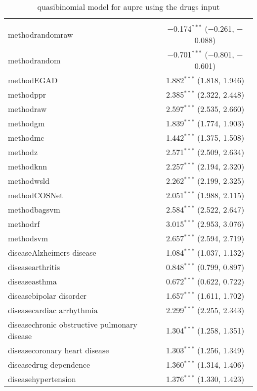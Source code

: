 
\begin{table}[!htbp] \centering 
  \caption{quasibinomial model for auprc using the drugs input} 
  \label{} 
\begin{tabular}{@{\extracolsep{5pt}}lc} 
\\[-1.8ex]\hline 
\hline \\[-1.8ex] 
 methodrandomraw & $-$0.174$^{***}$ ($-$0.261, $-$0.088) \\ 
  methodrandom & $-$0.701$^{***}$ ($-$0.801, $-$0.601) \\ 
  methodEGAD & 1.882$^{***}$ (1.818, 1.946) \\ 
  methodppr & 2.385$^{***}$ (2.322, 2.448) \\ 
  methodraw & 2.597$^{***}$ (2.535, 2.660) \\ 
  methodgm & 1.839$^{***}$ (1.774, 1.903) \\ 
  methodmc & 1.442$^{***}$ (1.375, 1.508) \\ 
  methodz & 2.571$^{***}$ (2.509, 2.634) \\ 
  methodknn & 2.257$^{***}$ (2.194, 2.320) \\ 
  methodwsld & 2.262$^{***}$ (2.199, 2.325) \\ 
  methodCOSNet & 2.051$^{***}$ (1.988, 2.115) \\ 
  methodbagsvm & 2.584$^{***}$ (2.522, 2.647) \\ 
  methodrf & 3.015$^{***}$ (2.953, 3.076) \\ 
  methodsvm & 2.657$^{***}$ (2.594, 2.719) \\ 
  diseaseAlzheimers disease & 1.084$^{***}$ (1.037, 1.132) \\ 
  diseasearthritis & 0.848$^{***}$ (0.799, 0.897) \\ 
  diseaseasthma & 0.672$^{***}$ (0.622, 0.722) \\ 
  diseasebipolar disorder & 1.657$^{***}$ (1.611, 1.702) \\ 
  diseasecardiac arrhythmia & 2.299$^{***}$ (2.255, 2.343) \\ 
  diseasechronic obstructive pulmonary disease & 1.304$^{***}$ (1.258, 1.351) \\ 
  diseasecoronary heart disease & 1.303$^{***}$ (1.256, 1.349) \\ 
  diseasedrug dependence & 1.360$^{***}$ (1.314, 1.406) \\ 
  diseasehypertension & 1.376$^{***}$ (1.330, 1.423) \\ 

\end{tabular}
\end{table}
